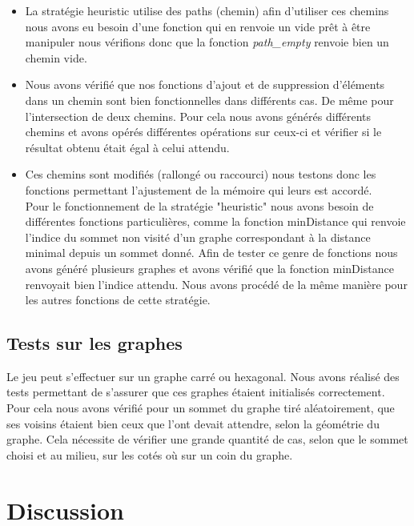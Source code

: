 \documentclass[a4paper,10pt]{article}
\begin{document}
\begin{itemize}
    \item La stratégie heuristic utilise des paths (chemin) afin d'utiliser ces chemins nous avons eu besoin d'une fonction qui en renvoie un vide prêt à être manipuler nous vérifions donc que la fonction \textit{path\_empty} renvoie bien un chemin vide. \\
    \item Nous avons vérifié que nos fonctions d'ajout et de suppression d'éléments dans un chemin sont bien fonctionnelles dans différents cas. De même pour l'intersection de deux chemins. Pour cela nous avons générés différents chemins et avons opérés différentes opérations sur ceux-ci et vérifier si le résultat obtenu était égal à celui attendu. \\
    \item Ces chemins sont modifiés (rallongé ou raccourci) nous testons donc les fonctions permettant l'ajustement de la mémoire qui leurs est accordé. \\
    
Pour le fonctionnement de la stratégie "heuristic" nous avons besoin de différentes fonctions particulières, comme la fonction minDistance qui renvoie l'indice du sommet non visité d'un graphe correspondant à la distance minimal depuis un sommet donné. Afin de tester ce genre de fonctions nous avons généré plusieurs graphes et avons vérifié que la fonction minDistance renvoyait bien l'indice attendu. Nous avons procédé de la même manière pour les autres fonctions de cette stratégie.

\end{itemize}

\subsection{Tests sur les graphes}
Le jeu peut s'effectuer sur un graphe carré ou hexagonal. Nous avons réalisé des tests permettant de s'assurer que ces graphes étaient initialisés correctement. Pour cela nous avons vérifié pour un sommet du graphe tiré aléatoirement, que ses voisins étaient bien ceux que l'ont devait attendre, selon la géométrie du graphe. Cela nécessite de vérifier une grande quantité de cas, selon que le sommet choisi et au milieu, sur les cotés où sur un coin du graphe.

\section{Discussion}
\end{document}
